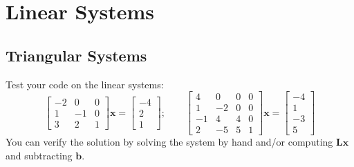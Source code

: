 \section{Linear Systems}

\subsection{Triangular Systems}

\begin{exercise}
	Test your code on the linear systems:
	\[
		\begin{bmatrix}
			-2 & 0  & 0 \\
			1  & -1 & 0 \\
			3  & 2  & 1
		\end{bmatrix}
		\mathbf{x} =
		\begin{bmatrix}
			-4 \\ 2 \\ 1
		\end{bmatrix};
		\qquad
		\begin{bmatrix}
			4  & 0  & 0 & 0 \\
			1  & -2 & 0 & 0 \\
			-1 & 4  & 4 & 0 \\
			2  & -5 & 5 & 1
		\end{bmatrix}
		\mathbf{x} = \begin{bmatrix}
			-4 \\ 1 \\ -3 \\ 5
		\end{bmatrix}
	\]
	You can verify the solution by solving the system by hand and/or computing
	$\mathbf{L}\mathbf{x}$ and subtracting $\mathbf{b}$.
\end{exercise}

